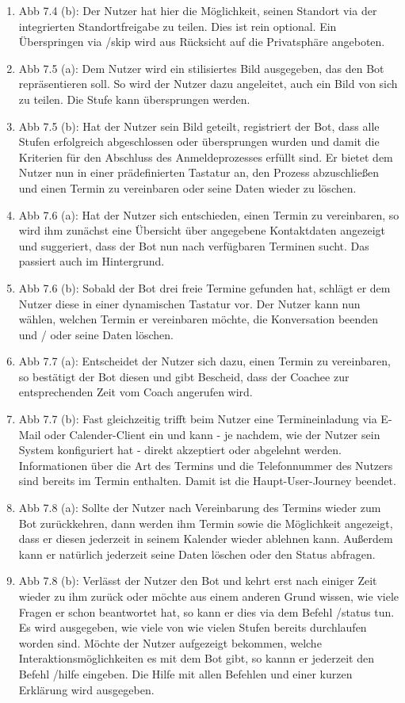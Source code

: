 \begin{enumerate}
		\item Abb 7.4 (b): Der Nutzer hat hier die Möglichkeit, seinen Standort via der integrierten Standortfreigabe zu teilen. Dies ist rein optional. Ein Überspringen via /skip wird aus Rücksicht auf die Privatsphäre angeboten. 
		\item Abb 7.5 (a): Dem Nutzer wird ein stilisiertes Bild ausgegeben, das den Bot repräsentieren soll. So wird der Nutzer dazu angeleitet, auch ein Bild von sich zu teilen. Die Stufe kann übersprungen werden.
		\item Abb 7.5 (b): Hat der Nutzer sein Bild geteilt, registriert der Bot, dass alle Stufen erfolgreich abgeschlossen oder übersprungen wurden und damit die Kriterien für den Abschluss des Anmeldeprozesses erfüllt sind. Er bietet dem Nutzer nun in einer prädefinierten Tastatur an, den Prozess abzuschließen und einen Termin zu vereinbaren oder seine Daten wieder zu löschen.
		\item Abb 7.6 (a): Hat der Nutzer sich entschieden, einen Termin zu vereinbaren, so wird ihm zunächst eine Übersicht über angegebene Kontaktdaten angezeigt und suggeriert, dass der Bot nun nach verfügbaren Terminen sucht. Das passiert auch im Hintergrund.
		\item Abb 7.6 (b): Sobald der Bot drei freie Termine gefunden hat, schlägt er dem Nutzer diese in einer dynamischen Tastatur vor. Der Nutzer kann nun wählen, welchen Termin er vereinbaren möchte, die Konversation beenden und / oder seine Daten löschen.
		\item Abb 7.7 (a): Entscheidet der Nutzer sich dazu, einen Termin zu vereinbaren, so bestätigt der Bot diesen und gibt Bescheid, dass der Coachee zur entsprechenden Zeit vom Coach angerufen wird. 
		\item Abb 7.7 (b): Fast gleichzeitig trifft beim Nutzer eine Termineinladung via E-Mail oder Calender-Client ein und kann - je nachdem, wie der Nutzer sein System konfiguriert hat - direkt akzeptiert oder abgelehnt werden. Informationen über die Art des Termins und die Telefonnummer des Nutzers sind bereits im Termin enthalten. Damit ist die Haupt-User-Journey beendet.
		\item Abb 7.8 (a): Sollte der Nutzer nach Vereinbarung des Termins wieder zum Bot zurückkehren, dann werden ihm Termin sowie die Möglichkeit angezeigt, dass er diesen jederzeit in seinem Kalender wieder ablehnen kann. Außerdem kann er natürlich jederzeit seine Daten löschen oder den Status abfragen.
		\item Abb 7.8 (b): Verlässt der Nutzer den Bot und kehrt erst nach einiger Zeit wieder zu ihm zurück oder möchte aus einem anderen Grund wissen, wie viele Fragen er schon beantwortet hat, so kann er dies via dem Befehl /status tun. Es wird ausgegeben, wie viele von wie vielen Stufen bereits durchlaufen worden sind. Möchte der Nutzer aufgezeigt bekommen, welche Interaktionsmöglichkeiten es mit dem Bot gibt, so kannn er jederzeit den Befehl /hilfe eingeben. Die Hilfe mit allen Befehlen und einer kurzen Erklärung wird ausgegeben.

\end{enumerate}
